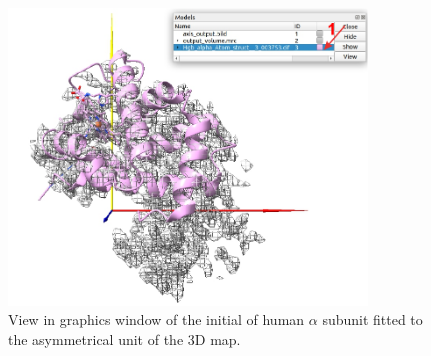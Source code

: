   \begin{figure}[H]
  \centering 
  \captionsetup{width=.7\linewidth} 
  \includegraphics[width=0.85\textwidth]{Images/Fig23}
  \caption{View in \chimera graphics window of the initial  of human  $\alpha$ subunit fitted to the asymmetrical unit of the 3D map.}
  \label{fig:chimera_fit_results_2}
  \end{figure}

 
